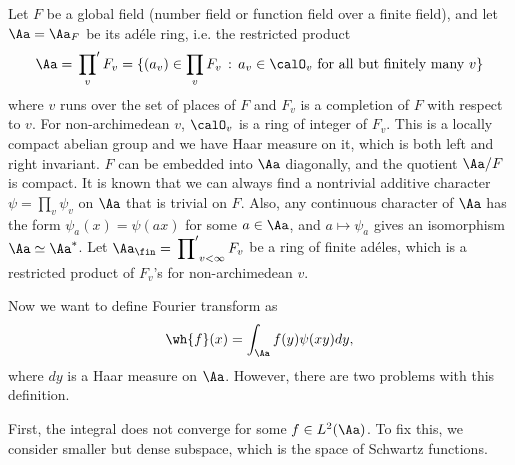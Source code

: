 Let $F$ be a global field (number field or function field over a finite field), and let $\Aa = \Aa_{F}$ be its ad\'ele ring, i.e. the restricted product
$$
\Aa = \sideset{}{'}\prod_{v} F_{v} = \{ (a_{v}) \in \prod_{v} F_{v}\,:\, a_{v} \in \calO_{v}\text{ for all but finitely many }v\}
$$
where $v$ runs over the set of places of $F$ and $F_{v}$ is a completion of $F$ with respect to $v$. For non-archimedean $v$, $\calO_{v}$ is a ring of integer of $F_{v}$. 
This is a locally compact abelian group and we have Haar measure on it, which is both left and right invariant. 
$F$ can be embedded into $\Aa$ diagonally, and the quotient $\Aa/F$ is compact. It is known that we can always find a nontrivial additive character $\psi = \prod_{v}\psi_{v}$ on $\Aa$ that is trivial on $F$. 
Also, any continuous character of $\Aa$ has the form $\psi_{a}(x) = \psi(ax)$ for some $a\in \Aa$, and $a\mapsto \psi_{a}$ gives an isomorphism $\Aa \simeq \Aa^{*}$. 
Let $\Aa_{\fin} = \sideset{}{'}\prod_{v<\infty} F_{v}$ be a ring of finite ad\'eles, which is a restricted product of $F_{v}$'s for non-archimedean $v$. 

Now we want to define Fourier transform  as 
$$
\wh{f}(x) = \int_{\Aa}f(y)\psi(xy)dy,
$$
where $dy$ is a Haar measure on $\Aa$. However, there are two problems with this definition. 

First, the integral does not converge for some $f\in L^{2}(\Aa)$. To fix this, we consider smaller but dense subspace, which is the space of Schwartz functions. 

